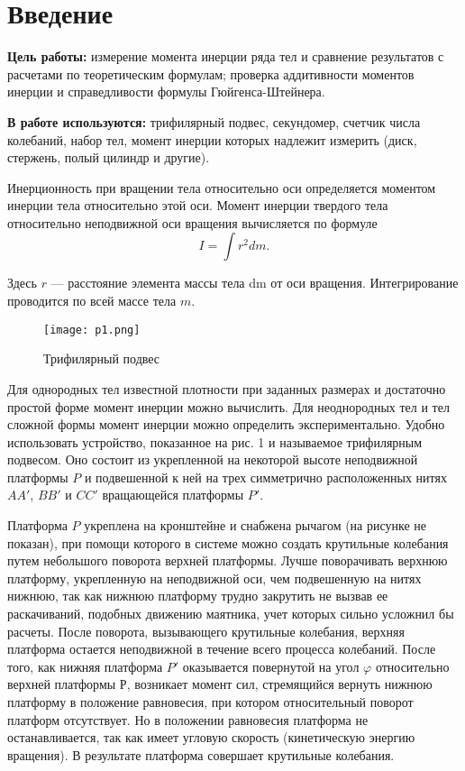 \section{Введение}

\textbf{Цель работы:}
измерение момента инерции ряда тел и сравнение результатов с расчетами
по теоретическим формулам; проверка аддитивности моментов инерции и
справедливости формулы Гюйгенса-Штейнера.

\textbf{В работе используются:}
трифилярный подвес, секундомер, счетчик числа колебаний, набор тел,
момент инерции которых надлежит измерить (диск, стержень, полый цилиндр
и другие).

Инерционность при вращении тела относительно оси определяется моментом
инерции тела относительно этой оси. Момент инерции твердого тела
относительно неподвижной оси вращения вычисляется по формуле
\begin{equation}
    I = \int r^2dm.
\end{equation}

Здесь $r$ — расстояние элемента массы тела dm от оси вращения.
Интегрирование проводится по всей массе тела $m$.
\begin{figure}[H]
    \centering
\texttt{[image: p1.png]}
    \caption{Трифилярный подвес}
    \label{fig:my_label}
\end{figure}

Для однородных тел известной плотности при заданных размерах и
достаточно простой форме момент инерции можно вычислить. Для
неоднородных тел и тел сложной формы момент инерции можно определить
экспериментально. Удобно использовать устройство, показанное на рис. 1
и называемое трифилярным подвесом. Оно состоит из укрепленной на
некоторой высоте неподвижной платформы $P$ и подвешенной к ней на трех
симметрично расположенных нитях $AA'$, $BB'$ и $CC'$ вращающейся
платформы $P'$.

Платформа $P$ укреплена на кронштейне и снабжена рычагом (на рисунке не
показан), при помощи которого в системе можно создать крутильные
колебания путем небольшого поворота верхней платформы. Лучше
поворачивать верхнюю платформу, укрепленную на неподвижной оси, чем
подвешенную на нитях нижнюю, так как нижнюю платформу трудно закрутить
не вызвав ее раскачиваний, подобных движению маятника, учет которых
сильно усложнил бы расчеты. После поворота, вызывающего крутильные
колебания, верхняя платформа остается неподвижной в течение всего
процесса колебаний. После того, как нижняя платформа $P'$ оказывается
повернутой на угол $\varphi$ относительно верхней платформы $Р$,
возникает момент сил, стремящийся вернуть нижнюю платформу в положение
равновесия, при котором относительный поворот платформ отсутствует. Но в
положении равновесия платформа не останавливается, так как имеет угловую
скорость (кинетическую энергию вращения). В результате платформа
совершает крутильные колебания.

